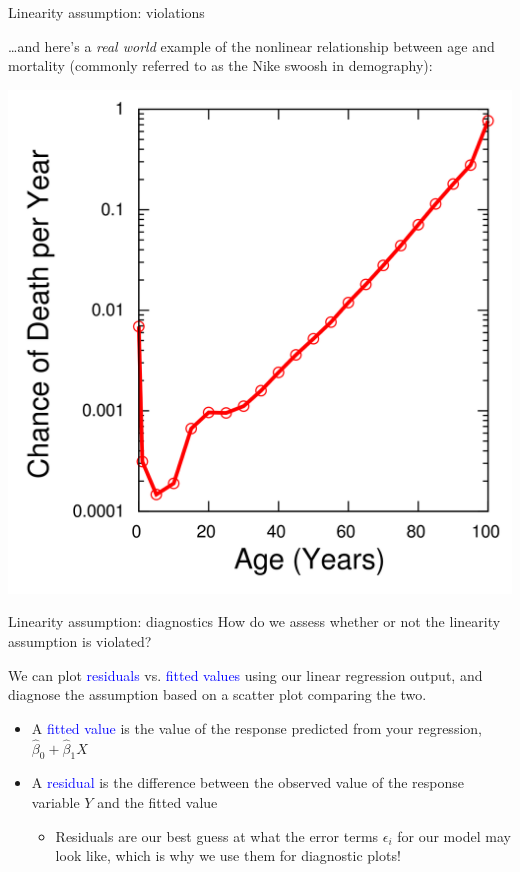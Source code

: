 \documentclass[10pt,t]{beamer}
\begin{document}
\begin{frame}{Linearity assumption: violations}

\dots and here's a \textit{real world} example of the nonlinear relationship between age and mortality (commonly referred to as the Nike swoosh in demography):

\vspace{0.3cm}

\centering \includegraphics[scale=0.1]{mortality_curve.png}

\end{frame}

\begin{frame}{Linearity assumption: diagnostics}
How do we assess whether or not the linearity assumption is violated?

\vspace{0.3cm}

We can plot \textcolor{blue}{residuals} vs. \textcolor{blue}{fitted values} using our linear regression output, and diagnose the assumption based on a scatter plot comparing the two.

\vspace{0.3cm}

\begin{itemize}
	\item A \textcolor{blue}{fitted value} is the value of the response predicted from your regression, $\hat{\beta}_0 + \hat{\beta}_1 X$
	\item A \textcolor{blue}{residual} is the difference between the observed value of the response variable $Y$ and the fitted value
	\begin{itemize}
		\item[] Residuals are our best guess at what the error terms $\epsilon_i$ for our model may look like, which is why we use them for diagnostic plots!
	\end{itemize}
\end{itemize}
\end{frame}
\end{document}
